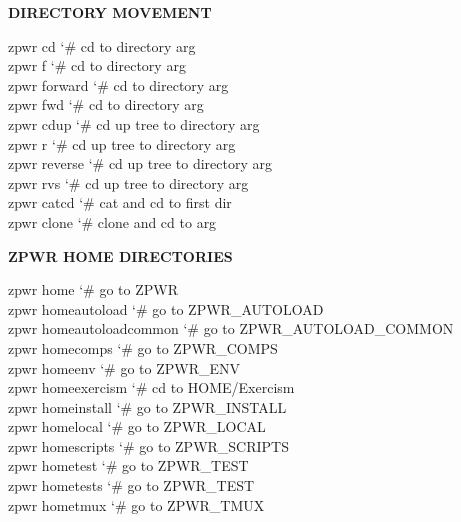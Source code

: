 \documentclass[11pt,a4paper,twoside]{book}
\begin{document}
\vspace{12pt}
{\bfseries\color{neonyellow} DIRECTORY MOVEMENT}\vspace{4pt}

\begin{codebox}
\color{neongreen}zpwr cd                    {\char`\#} cd to directory arg\\
\color{neongreen}zpwr f                     {\char`\#} cd to directory arg\\
\color{neongreen}zpwr forward               {\char`\#} cd to directory arg\\
\color{neongreen}zpwr fwd                   {\char`\#} cd to directory arg\\
\color{neongreen}zpwr cdup                  {\char`\#} cd up tree to directory arg\\
\color{neongreen}zpwr r                     {\char`\#} cd up tree to directory arg\\
\color{neongreen}zpwr reverse               {\char`\#} cd up tree to directory arg\\
\color{neongreen}zpwr rvs                   {\char`\#} cd up tree to directory arg\\
\color{neongreen}zpwr catcd                 {\char`\#} cat and cd to first dir\\
\color{neongreen}zpwr clone                 {\char`\#} clone and cd to arg\\
\end{codebox}


\vspace{12pt}
{\bfseries\color{neonyellow} \textbf{ZPWR} \textbf{HOME} DIRECTORIES}\vspace{4pt}

\begin{codebox}
\color{neongreen}zpwr home                  {\char`\#} go to ZPWR\\
\color{neongreen}zpwr homeautoload          {\char`\#} go to ZPWR\_AUTOLOAD\\
\color{neongreen}zpwr homeautoloadcommon    {\char`\#} go to ZPWR\_AUTOLOAD\_COMMON\\
\color{neongreen}zpwr homecomps             {\char`\#} go to ZPWR\_COMPS\\
\color{neongreen}zpwr homeenv               {\char`\#} go to ZPWR\_ENV\\
\color{neongreen}zpwr homeexercism          {\char`\#} cd to HOME/Exercism\\
\color{neongreen}zpwr homeinstall           {\char`\#} go to ZPWR\_INSTALL\\
\color{neongreen}zpwr homelocal             {\char`\#} go to ZPWR\_LOCAL\\
\color{neongreen}zpwr homescripts           {\char`\#} go to ZPWR\_SCRIPTS\\
\color{neongreen}zpwr hometest              {\char`\#} go to ZPWR\_TEST\\
\color{neongreen}zpwr hometests             {\char`\#} go to ZPWR\_TEST\\
\color{neongreen}zpwr hometmux              {\char`\#} go to ZPWR\_TMUX\\
\end{codebox}
\end{document}

